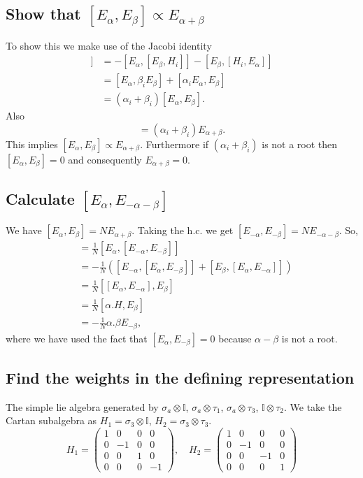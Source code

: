 \documentclass[main.tex]{subfiles}
\begin{document}
\subsection{Show that $[E_{\alpha},E_{\beta}]\propto E_{\alpha+\beta}$}\label{Qu6A}
To show this we make use of the Jacobi identity
\begin{align}
[H_i,[E_{\alpha},E_{\beta}]]&=-[E_{\alpha},[E_{\beta},H_i]]-[E_{\beta},[H_i,E_{\alpha}]]\\
&=[E_{\alpha},\beta_iE_{\beta}]+[\alpha_iE_{\alpha},E_{\beta}]\\
&=(\alpha_i+\beta_i)[E_{\alpha},E_{\beta}].
\end{align}
Also
\begin{equation}
[H_i,E_{\alpha+\beta}]=(\alpha_i+\beta_i)E_{\alpha+\beta}.
\end{equation}
This implies $[E_{\alpha},E_{\beta}]\propto E_{\alpha+\beta}$. Furthermore if $(\alpha_i+\beta_i)$ is not a root then $[E_{\alpha},E_{\beta}]=0$ and consequently $E_{\alpha+\beta}=0$.

\subsection{Calculate $[E_{\alpha},E_{-\alpha-\beta}]$}
We have $[E_{\alpha},E_{\beta}]=NE_{\alpha+\beta}$. Taking the h.c. we get $[E_{-\alpha},E_{-\beta}]=NE_{-\alpha-\beta}$. So,
\begin{align}
[E_{\alpha},E_{-\alpha-\beta}]&=\frac{1}{N}[E_{\alpha},[E_{-\alpha},E_{-\beta}]]\\
&=-\frac{1}{N}\left([E_{-\alpha},[E_{\alpha},E_{-\beta}]]+[E_{\beta},[E_{\alpha},E_{-\alpha}]]\right)\\
&=\frac{1}{N}[[E_{\alpha},E_{-\alpha}],E_{\beta}]\\
&=\frac{1}{N}[\alpha.H,E_{\beta}]\\
&=-\frac{1}{N}\alpha.\beta E_{-\beta},
\end{align}
where we have used the fact that $[E_{\alpha},E_{-\beta}]=0$ because $\alpha-\beta$ is not a root.

\subsection{Find the weights in the defining representation}
The simple lie algebra generated by $\sigma_a\otimes\mathbb{I}$, $\sigma_a\otimes\tau_1$, $\sigma_a\otimes\tau_3$, $\mathbb{I}\otimes\tau_2$. We take the Cartan subalgebra as $H_1=\sigma_3\otimes\mathbb{I}$, $H_2=\sigma_3\otimes\tau_3$.
\begin{equation}
H_1=\begin{pmatrix}1&0&0&0\\0&-1&0&0\\0&0&1&0\\0&0&0&-1\end{pmatrix},\quad H_2=\begin{pmatrix}1&0&0&0\\0&-1&0&0\\0&0&-1&0\\0&0&0&1\end{pmatrix}
\end{equation}
\end{document}
